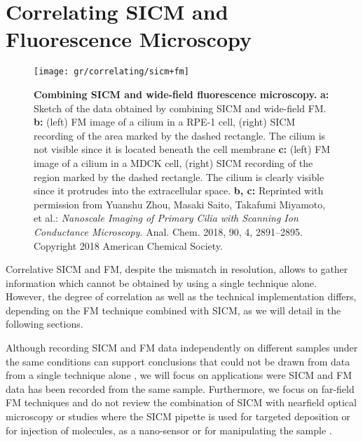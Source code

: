 \section{Correlating SICM and Fluorescence Microscopy}
\label{sec:correlating-sicm-and-fm}

\begin{figure}
  \texttt{[image: gr/correlating/sicm+fm]}
  \caption{%
    \textbf{Combining SICM and wide-field fluorescence microscopy.}
    \textbf{a:} Sketch of the data obtained by combining SICM and wide-field
    FM. 
    \textbf{b:} (left) FM image of a cilium in a RPE-1 cell, (right) SICM recording of
    the area marked by the dashed rectangle. The cilium is not visible since
    it is located beneath the cell membrane \textbf{c:} (left) FM image of a
    cilium in a MDCK cell, (right) SICM recording of the
    region marked by the dashed rectangle. The cilium is clearly visible since
    it protrudes into the extracellular space.
    \textbf{b, c:} Reprinted with permission from Yuanshu Zhou, Masaki Saito,
    Takafumi Miyamoto, et al.: \emph{Nanoscale Imaging of Primary Cilia with
      Scanning Ion Conductance Microscopy.} Anal. Chem. 2018, 90, 4,
    2891–2895. Copyright 2018 American Chemical Society.
  }
  \label{fig:sicm+fm}
\end{figure}

Correlative SICM and FM, despite the mismatch in resolution, allows to gather
information which cannot be obtained by using a single technique
alone. However, the degree of correlation as well as the technical
implementation differs, depending on the FM technique combined with SICM, as
we will detail in the following sections.

Although recording SICM and FM data independently on different samples under
the same conditions can support conclusions that could not be drawn from data
from a single technique alone \cite{Gesper2017,Lee2013,Lyon2009}, we will
focus on applications were SICM and FM data has been recorded from the same
sample. Furthermore, we focus on far-field FM techniques and do not review the
combination of SICM with nearfield optical microscopy  
\cite{Korchev2000,Shevchuk2001,Rothery2003,Bruckbauer2002} or studies where
the SICM pipette is used for targeted deposition 
\cite{Ying2002,Bruckbauer2007,Bruckbauer2010,Hennig2015} or for injection 
\cite{Hennig2015a} of molecules, as a nano-sensor \cite{Piper2006} or for manipulating the sample
\cite{Fuentes2012,Wang2020}.

